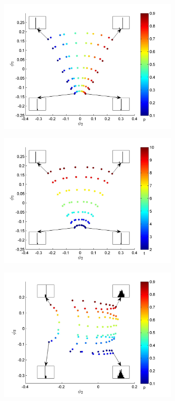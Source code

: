 \documentclass[prl,reprint]{revtex4-1}
\begin{document}
\begin{figure}[htb]
\begin{subfigure}{0.4\textwidth}
\includegraphics[width=\textwidth]{EMD_withhist_p_1}
\caption{}
\end{subfigure}
\begin{subfigure}{0.4\textwidth}
\includegraphics[width=\textwidth]{EMD_withhist_t_1}
\caption{}
\end{subfigure}
\begin{subfigure}{0.4\textwidth}
\includegraphics[width=\textwidth]{EMD_withhist_p_400}

\end{subfigure}
\end{figure}
\end{document}

